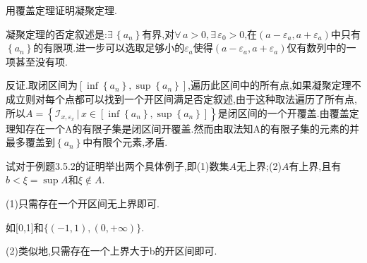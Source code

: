      \begin{exercise}
         用覆盖定理证明凝聚定理.
     \end{exercise}
     \begin{solution}
         凝聚定理的否定叙述是:$\exists\, \left\{a_n\right\}$有界,对$\forall\, a>0,\exists\, \varepsilon_0>0$,在$\left(a-\varepsilon_a,a+\varepsilon_a\right)$中只有$\left\{a_n\right\}$的有限项.进一步可以选取足够小的$\varepsilon_a$使得$\left(a-\varepsilon_a,a+\varepsilon_a\right)$仅有数列中的一项甚至没有项.

         反证.取闭区间为$\left[\inf\left\{a_n\right\},\sup\left\{a_n\right\}\right]$,遍历此区间中的所有点,如果凝聚定理不成立则对每个点都可以找到一个开区间满足否定叙述,由于这种取法遍历了所有点,所以$A=\left\{\mathcal{I}_{x,\varepsilon_x}\, |\, x\in\left[\inf\left\{a_n\right\},\sup\left\{a_n\right\}\right] \right\}$是闭区间的一个开覆盖.由覆盖定理知存在一个A的有限子集是闭区间开覆盖.然而由取法知A的有限子集的元素的并最多覆盖到$\left\{a_n\right\}$中有限个元素,矛盾.
     \end{solution}

     \begin{exercise}
         试对于例题3.5.2的证明举出两个具体例子,即(1)数集$A$无上界;(2)$A$有上界,且有$b<\xi =\sup A$和$\xi \notin A$.
     \end{exercise}
     \begin{solution}
         (1)只需存在一个开区间无上界即可.

         如[0,1]和$\{(-1,1),(0,+\infty)\}$.

         (2)类似地,只需存在一个上界大于b的开区间即可.
     \end{solution}
